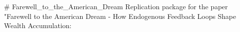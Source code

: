 # Farewell_to_the_American_Dream
Replication package for the paper "Farewell to the American Dream - How Endogenous Feedback Loops Shape  Wealth Accumulation:
